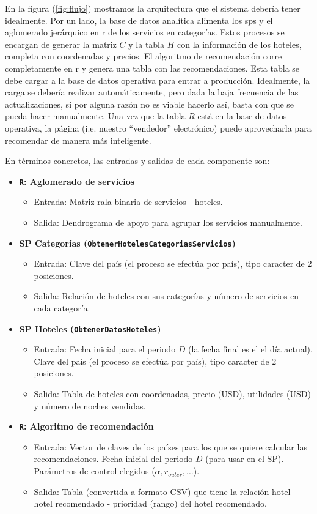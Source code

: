 \documentclass[12pt]{report}
\begin{document}
En la figura (\ref{fig:flujo}) mostramos la arquitectura que el sistema debería tener idealmente. Por un lado, la base de datos analítica alimenta los \glspl{sp} y el aglomerado jerárquico en \gls{r} de los servicios en categorías. Estos procesos se encargan de generar la matriz $C$ y la tabla $H$ con la información de los hoteles, completa con coordenadas y precios. El algoritmo de recomendación corre completamente en \gls{r} y genera una tabla con las recomendaciones. Esta tabla se debe cargar a la base de datos operativa para entrar a producción. Idealmente, la carga se debería realizar automáticamente, pero dada la baja frecuencia de las actualizaciones, si por alguna razón no es viable hacerlo así, basta con que se pueda hacer manualmente. Una vez que la tabla $R$ está en la base de datos operativa, la página (i.e. nuestro ``vendedor'' electrónico) puede aprovecharla para recomendar de manera más inteligente.

En términos concretos, las entradas y salidas de cada componente son:
\begin{itemize}
	\item \textbf{\texttt{R}: Aglomerado de servicios}
	\begin{itemize}
		\item Entrada: Matriz rala binaria de servicios - hoteles.
		\item Salida: Dendrograma de apoyo para agrupar los servicios manualmente.
	\end{itemize}
	\item \textbf{SP Categorías (\texttt{ObtenerHotelesCategoriasServicios})}
	\begin{itemize}
		\item Entrada: Clave del país (el proceso se efectúa por país), tipo caracter de 2 posiciones.
		\item Salida: Relación de hoteles con sus categorías y número de servicios en cada categoría.
	\end{itemize}
	\item \textbf{SP Hoteles (\texttt{ObtenerDatosHoteles})}
	\begin{itemize}
		\item Entrada: Fecha inicial para el periodo $D$ (la fecha final es el el día actual). Clave del país (el proceso se efectúa por país), tipo caracter de 2 posiciones.
		\item Salida: Tabla de hoteles con coordenadas, precio (USD), utilidades (USD) y número de noches vendidas.
	\end{itemize}
	\item \textbf{\texttt{R}: Algoritmo de recomendación}
	\begin{itemize}
		\item Entrada: Vector de claves de los países para los que se quiere calcular las recomendaciones. Fecha inicial del periodo $D$ (para usar en el SP). Parámetros de control elegidos ($\alpha, r_{outer}, \dots$).
		\item Salida: Tabla (convertida a formato CSV) que tiene la relación hotel - hotel recomendado - prioridad (rango) del hotel recomendado.
	\end{itemize}
\end{itemize}
\end{document}
